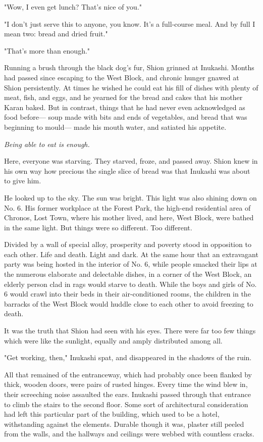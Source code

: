 "Wow, I even get lunch? That's nice of you."

"I don't just serve this to anyone, you know. It's a full-course meal.
And by full I mean two: bread and dried fruit."

"That's more than enough."

Running a brush through the black dog's fur, Shion grinned at Inukashi.
Months had passed since escaping to the West Block, and chronic hunger
gnawed at Shion persistently. At times he wished he could eat his fill
of dishes with plenty of meat, fish, and eggs, and he yearned for the
bread and cakes that his mother Karan baked. But in contrast, things
that he had never even acknowledged as food before--- soup made with bits
and ends of vegetables, and bread that was beginning to mould--- made his
mouth water, and satiated his appetite.

\emph{Being able to eat is enough.}

Here, everyone was starving. They starved, froze, and passed away. Shion
knew in his own way how precious the single slice of bread was that
Inukashi was about to give him.

He looked up to the sky. The sun was bright. This light was also shining
down on No. 6. His former workplace at the Forest Park, the high-end
residential area of Chronos, Lost Town, where his mother lived, and
here, West Block, were bathed in the same light. But things were so
different. Too different.

Divided by a wall of special alloy, prosperity and poverty stood in
opposition to each other. Life and death. Light and dark. At the same
hour that an extravagant party was being hosted in the interior of No.
6, while people smacked their lips at the numerous elaborate and
delectable dishes, in a corner of the West Block, an elderly person clad
in rags would starve to death. While the boys and girls of No. 6 would
crawl into their beds in their air-conditioned rooms, the children in
the barracks of the West Block would huddle close to each other to avoid
freezing to death.

It was the truth that Shion had seen with his eyes. There were far too
few things which were like the sunlight, equally and amply distributed
among all.

"Get working, then," Inukashi spat, and disappeared in the shadows of
the ruin.

\myspace

All that remained of the entranceway, which had probably once been
flanked by thick, wooden doors, were pairs of rusted hinges. Every time
the wind blew in, their screeching noise assaulted the ears. Inukashi
passed through that entrance to climb the stairs to the second floor.
Some sort of architectural consideration had left this particular part
of the building, which used to be a hotel, withstanding against the
elements. Durable though it was, plaster still peeled from the walls,
and the hallways and ceilings were webbed with countless cracks.

